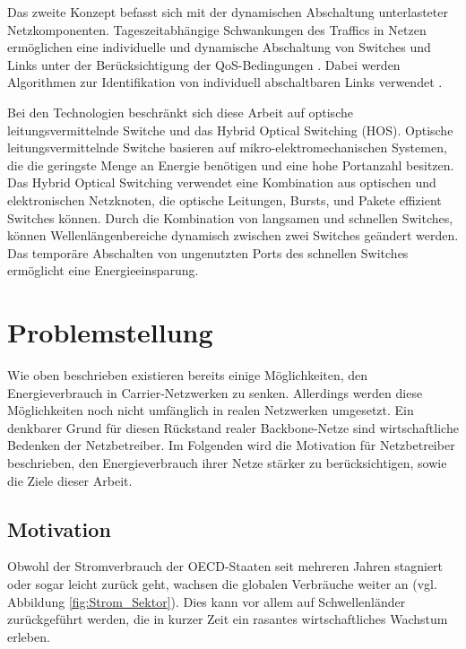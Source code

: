 \documentclass[12pt,titlepage]{article}
\begin{document}
Das zweite Konzept befasst sich mit der dynamischen Abschaltung unterlasteter Netzkomponenten. Tageszeitabhängige Schwankungen des Traffics in Netzen ermöglichen eine individuelle und dynamische Abschaltung von Switches und Links unter der Be\-rück\-sich\-ti\-gung der QoS-Bedingungen \cite{aleksic2013}. Dabei werden Algorithmen zur Identifikation von individuell abschaltbaren Links verwendet \cite{fisher}.

Bei den Technologien beschränkt sich diese Arbeit auf optische leitungsvermittelnde Switche und das Hybrid Optical Switching (HOS). Optische leitungsvermittelnde Switche basieren auf mikro-elektromechanischen Systemen, die die geringste Menge an Energie benötigen und eine hohe Portanzahl besitzen. Das Hybrid Optical Switching verwendet eine Kombination aus optischen und elektronischen Netzknoten, die optische Leitungen, Bursts, und Pakete effizient Switches können. Durch die Kombination von langsamen und schnellen Switches, können Wellenlängenbereiche dynamisch zwischen zwei Switches geändert werden. Das temporäre Abschalten von ungenutzten Ports des schnellen Switches ermöglicht eine Energieeinsparung.  \cite{aleksic2013}

\section{Problemstellung}
Wie oben beschrieben existieren bereits einige Möglichkeiten, den Energieverbrauch in Carrier-Netzwerken zu senken. Allerdings werden diese Möglichkeiten noch nicht umfänglich in realen Netzwerken umgesetzt. Ein denkbarer Grund für diesen Rückstand realer Backbone-Netze sind wirtschaftliche Bedenken der Netzbetreiber. Im Folgenden wird die Motivation für Netzbetreiber beschrieben, den Energieverbrauch ihrer Netze stärker zu berücksichtigen, sowie die Ziele dieser Arbeit.

\subsection{Motivation}
Obwohl der Stromverbrauch der OECD-Staaten seit mehreren Jahren stagniert oder sogar leicht zurück geht, wachsen die globalen Verbräuche weiter an (vgl. Abbildung \ref{fig:Strom_Sektor}). Dies kann vor allem auf  Schwellenländer zurückgeführt werden, die in kurzer Zeit ein rasantes wirtschaftliches Wachstum erleben.
\end{document}
